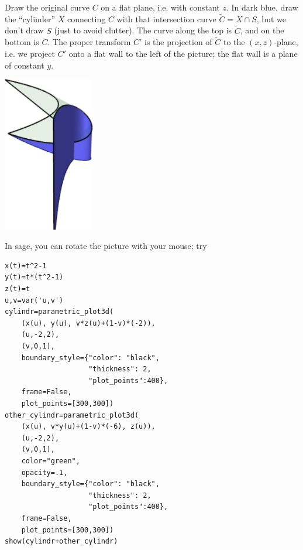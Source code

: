 Draw the original curve \(C\) on a flat plane, i.e. with constant \(z\).
In dark blue, draw the ``cylinder'' \(X\) connecting \(C\) with  that intersection curve \(\tilde{C}=X\cap S\), but we don't draw \(S\) (just to avoid clutter).
The curve along the top is \(\tilde{C}\), and on the bottom is \(C\). 
The proper transform \(C'\) is the projection of \(\tilde{C}\) to the \((x,z)\)-plane, i.e. we project \(C'\) onto a flat wall to the left of the picture; the flat wall is a plane of constant \(y\).
\begin{center}
\includegraphics[width=4cm]{blow-up-nodal-cubic}
\end{center}
In sage, you can rotate the picture with your mouse; try
\begin{verbatim}
x(t)=t^2-1
y(t)=t*(t^2-1)
z(t)=t
u,v=var('u,v')
cylindr=parametric_plot3d(
    (x(u), y(u), v*z(u)+(1-v)*(-2)), 
    (u,-2,2), 
    (v,0,1),
    boundary_style={"color": "black", 
                    "thickness": 2,
                    "plot_points":400},
    frame=False,
    plot_points=[300,300])
other_cylindr=parametric_plot3d(
    (x(u), v*y(u)+(1-v)*(-6), z(u)), 
    (u,-2,2), 
    (v,0,1),
    color="green",
    opacity=.1,
    boundary_style={"color": "black", 
                    "thickness": 2,
                    "plot_points":400},
    frame=False,
    plot_points=[300,300])
show(cylindr+other_cylindr)
\end{verbatim}

